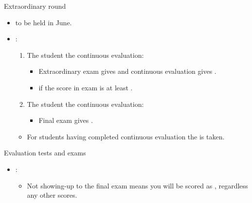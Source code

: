\begin{frame}[t]{Extraordinary round}
\begin{itemize}
  \item {} to be held in June.

  \item {}:
    \begin{enumerate}
      \item The student  the continuous evaluation:
        \begin{itemize}
          \item Extraordinary exam gives  
                and continuous evaluation gives .
          \item {} if the score in exam is at least .
        \end{itemize}
      \item The student  the continuous evaluation: 
        \begin{itemize}
          \item Final exam gives .
        \end{itemize}
    \end{enumerate}

    \begin{itemize}
      \item For students having completed continuous evaluation 
            the  is taken.
    \end{itemize}
\end{itemize}
\end{frame}

\begin{frame}[t]{Evaluation tests and exams}
\begin{itemize}
  \item {}:
    \begin{itemize}
      \item Not showing-up to the final exam means you will be scored 
            as , 
            regardless any other scores.
    \end{itemize}
\end{itemize}
\end{frame}

